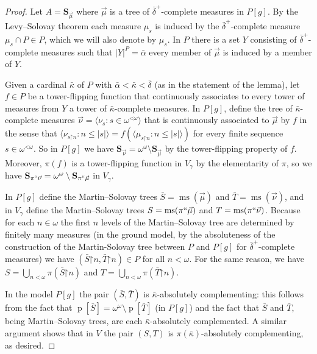\documentclass[fleqn, 11pt]{amsart}
\theoremstyle{plain}
\theoremstyle{definition}
\theoremstyle{remark}
\newcommand{\restrict}{\mathord{\restriction}}
\DeclareMathOperator{\ms}{ms}
\DeclareMathOperator{\p}{p}
\begin{document}
\begin{proof}
 Let $A = \textbf{S}_{\vec{\mu}}$ where $\vec{\mu}$ is a tree of $\bar{\delta}^+$-complete measures in $P[g]$.  By the Levy--Solovay theorem each measure $\mu_s$ is induced by the $\bar{\delta}^+$-complete measure $\mu_s \cap P \in P$, which we will also denote by $\mu_s$. In $P$ there is a set $Y$ consisting of $\bar{\delta}^+$-complete measures such that $|Y|^{P} = \bar{\alpha}$  every member  of $\vec{\mu}$ is induced by a member of $Y$.
 

 Given a cardinal $\bar{\kappa}$ of $P$ with $\bar{\alpha} < \bar{\kappa} < \bar{\delta}$ (as in the statement of the lemma), let $f \in P$ be a tower-flipping function that continuously associates to every tower of measures from $Y$ a tower of $\bar{\kappa}$-complete measures. In $P[g]$, define the tree of $\bar{\kappa}$-complete measures $\vec{\nu} = \langle\nu_s : s \in \omega^{\mathord{<}\omega}\rangle$ that is continuously associated to $\vec{\mu}$ by $f$ in the sense that $\langle\nu_{s \restrict n} : n \le \left|s\right|\rangle = f(\langle\mu_{s \restrict n} :n \le \left|s\right|\rangle)$ for every finite sequence $s \in \omega^{\mathord{<}\omega}$. So in $P[g]$ we have $\textbf{S}_{\vec{\nu}} = \omega^\omega \setminus\textbf{S}_{\vec{\mu}}$ by the tower-flipping property of $f$. Moreover, $\pi(f)$ is a tower-flipping function in $V_{\gamma}$ by the elementarity of $\pi$, so we have $\textbf{S}_{\pi``\vec{\nu}} = \omega^\omega \setminus\textbf{S}_{\pi``\vec{\mu}}$ in $V_{\gamma}$.

 
 In $P[g]$ define the Martin--Solovay trees $\bar{S} = \ms(\vec{\mu})$ and $\bar{T} = \ms(\vec{\nu})$, and in $V_{\gamma}$ define the Martin--Solovay trees $S = \ms(\pi``\vec{\mu})$ and $T = \ms(\pi``\vec{\nu})$. Because for each $n \in \omega$ the first $n$ levels of the Martin--Solovay tree are determined by finitely many measures (in the ground model, by the absoluteness of the construction of the Martin-Solovay tree between $P$ and $P[g]$ for $\bar{\delta}^{+}$-complete measures) we have $(\bar{S} \restrict n,\bar{T} \restrict n) \in P$ for all $n<\omega$. For the same reason, we have $S = \bigcup_{n<\omega} \pi(\bar{S}\restrict n)$ and $T = \bigcup_{n<\omega} \pi(\bar{T}\restrict n)$.

In the model $P[g]$ the pair $(\bar{S},\bar{T})$ is $\bar{\kappa}$-absolutely complementing: this follows from the fact that $\p[\bar{S}] = \omega^\omega \setminus \p[\bar{T}]$ (in $P[g]$) and the fact that $\bar{S}$ and $\bar{T}$, being Martin--Solovay trees, are each $\bar{\kappa}$-absolutely complemented.
 A similar argument shows that in $V$ the pair $(S,T)$ is $\pi(\bar{\kappa})$-absolutely complementing, as desired.
\end{proof}
\end{document}
